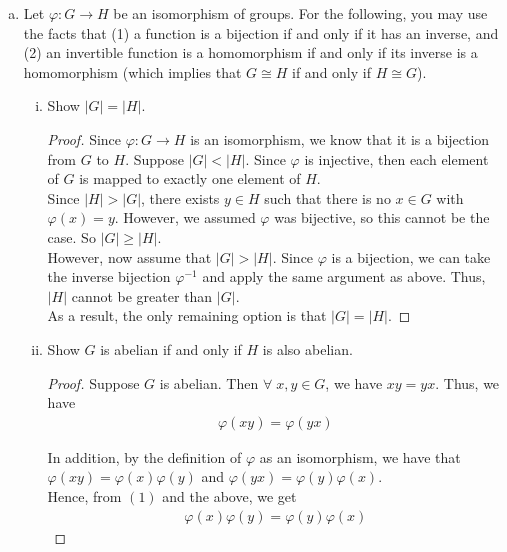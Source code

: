 \documentclass[11pt, reqno]{amsart}
\theoremstyle{plain}
\theoremstyle{definition}
\theoremstyle{example}
\begin{document}
\begin{enumerate}[1.]
\begin{enumerate}[(a)]
\begin{proof}
Hence we have that $\varphi(xy) = \varphi(x)\varphi(y)$ for all $x, y \in G$, so $\varphi$ is a homomorphism.
\end{proof}

\item Let $\varphi: G \to H$ be an isomorphism of groups. For the following, you may use the facts that (1) a function is a bijection if and only if it has an inverse, and (2) an invertible function is a homomorphism if and only if its inverse is a homomorphism (which implies that $G \cong H$ if and only if $H \cong G$).
\begin{enumerate}[(i)]
\item Show $|G|=|H|$.

\begin{proof}
Since $\varphi: G \to H$ is an isomorphism, we know that it is a bijection from $G$ to $H$. Suppose $|G| < |H|$. Since $\varphi$ is injective, then each element of $G$ is mapped to exactly one element of $H$. \\

Since $|H| > |G|$, there exists $y \in H$ such that there is no $x \in G$ with $\varphi(x) = y$. However, we assumed $\varphi$ was bijective, so this cannot be the case. So $|G| \geq |H|$.\\

However, now assume that $|G| > |H|$. Since $\varphi$ is a bijection, we can take the inverse bijection $\varphi^{-1}$ and apply the same argument as above. Thus, $|H|$ cannot be greater than $|G|$.\\

As a result, the only remaining option is that $|G| = |H|$.
\end{proof}

\item Show $G$ is abelian if and only if $H$ is also abelian. 
\begin{proof}
Suppose $G$ is abelian. Then $\forall \; x, y \in G$, we have $xy = yx$. Thus, we have
\begin{align}
\varphi(xy) = \varphi(yx)
\end{align}

In addition, by the definition of $\varphi$ as an isomorphism, we have that $\varphi(xy) = \varphi(x)\varphi(y)$ and $\varphi(yx) = \varphi(y)\varphi(x)$.\\

Hence, from $(1)$ and the above, we get
\begin{align*}
\varphi(x)\varphi(y) = \varphi(y)\varphi(x)
\end{align*}


\end{proof}
\end{enumerate}
\end{enumerate}
\end{enumerate}
\end{document}
